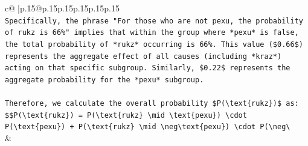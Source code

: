 \documentclass{article}
\begin{document}
{\begin{supertabular}{c@{$\;$}|p{.15\linewidth}@{}p{.15\linewidth}p{.15\linewidth}p{.15\linewidth}p{.15\linewidth}p{.15\linewidth}}
{{{\\ 
\texttt{Specifically, the phrase "For those who are not pexu, the probability of rukz is 66\%" implies that within the group where *pexu* is false, the total probability of *rukz* occurring is 66\%. This value (\$0.66\$) represents the aggregate effect of all causes (including *kraz*) acting on that specific subgroup. Similarly, \$0.22\$ represents the aggregate probability for the *pexu* subgroup.} \\
\\ 
\texttt{Therefore, we calculate the overall probability \$P(\textbackslash{}text\{rukz\})\$ as:} \\
\texttt{\$\$P(\textbackslash{}text\{rukz\}) = P(\textbackslash{}text\{rukz\} \textbackslash{}mid \textbackslash{}text\{pexu\}) \textbackslash{}cdot P(\textbackslash{}text\{pexu\}) + P(\textbackslash{}text\{rukz\} \textbackslash{}mid \textbackslash{}neg\textbackslash{}text\{pexu\}) \textbackslash{}cdot P(\textbackslash{}neg\textbackslash{}} \\
            }
        }
    }
    & \\ \\


\end{supertabular}}
\end{document}

